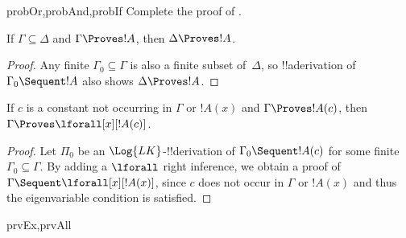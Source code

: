 \documentclass[../../include/open-logic-section]{subfiles}
\begin{document}
\begin{probtag}{probOr,probAnd,probIf}
Complete the proof of .
\end{probtag}

\begin{prop}[Monotony]
If $\Gamma \subseteq \Delta$ and $\Gamma \Proves !A$, then $\Delta
\Proves !A$.
\end{prop}

\begin{proof}
Any finite $\Gamma_0 \subseteq \Gamma$ is also a finite subset
of~$\Delta$, so !!a{derivation} of $\Gamma_0 \Sequent !A$ also shows
$\Delta \Proves !A$.
\end{proof}

\begin{thm}
 If $c$ is a constant not occurring
in $\Gamma$ or $!A(x)$ and $\Gamma \Proves !A(c)$, then $\Gamma
\Proves \lforall[x][!A(c)]$.
\end{thm}

\begin{proof}
Let $\Pi_0$ be an $\Log{LK}$-!!{derivation} of $\Gamma_0 \Sequent !A(c)$
for some finite $\Gamma_0 \subseteq \Gamma$.  By adding a $\lforall$
right inference, we obtain a proof of $\Gamma \Sequent
\lforall[x][!A(x)]$, since $c$ does not occur in $\Gamma$ or $!A(x)$
and thus the eigenvariable condition is satisfied.
\end{proof}

\begin{thm}
\begin{tagenumerate}{prvEx,prvAll}

\end{tagenumerate}
\end{thm}
\end{document}

